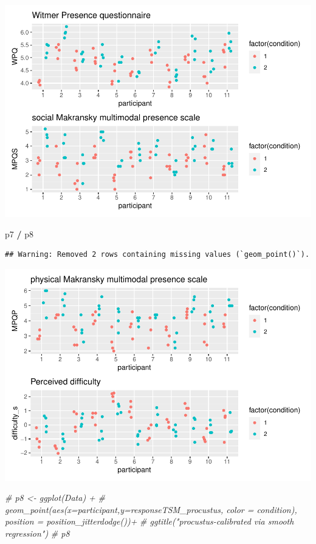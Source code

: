 \documentclass[
]{article}
\newenvironment{Shaded}{\begin{snugshade}}{\end{snugshade}}
\newcommand{\CommentTok}[1]{\textcolor[rgb]{0.56,0.35,0.01}{\textit{#1}}}
\newcommand{\NormalTok}[1]{#1}
\newcommand{\SpecialCharTok}[1]{\textcolor[rgb]{0.81,0.36,0.00}{\textbf{#1}}}
\begin{document}
\includegraphics{08_Publish_GUSO_ASIL_files/figure-latex/showmetrics2-1.pdf}

\begin{Shaded}
\begin{Highlighting}[]
\NormalTok{p7 }\SpecialCharTok{/}\NormalTok{ p8}
\end{Highlighting}
\end{Shaded}

\begin{verbatim}
## Warning: Removed 2 rows containing missing values (`geom_point()`).
\end{verbatim}

\includegraphics{08_Publish_GUSO_ASIL_files/figure-latex/showmetrics2-2.pdf}

\begin{Shaded}
\begin{Highlighting}[]
\CommentTok{\# p8 \textless{}{-} ggplot(Data) +}
\CommentTok{\#   geom\_point(aes(x=participant,y=responseTSM\_procustus, color = condition), position = position\_jitterdodge())+}
\CommentTok{\#   ggtitle("procustus{-}calibrated via smooth regression")}
\CommentTok{\# p8}
\end{Highlighting}
\end{Shaded}
\end{document}
